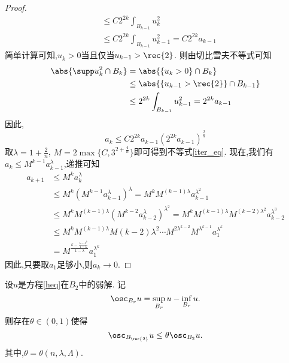 \begin{proof}
\begin{equation}
\begin{split}
            &\le C2^{2k}\int_{B_{k-1}}u_k^2 \\
            &\le C2^{2k}\int_{B_{k-1}}u_{k-1}^2=C2^{2k}a_{k-1}
        \end{split}
    \end{equation}
    简单计算可知,$u_k>0$当且仅当$u_{k-1}> \rec{2}$. 则由切比雪夫不等式可知
    \begin{equation}
        \begin{split}
            \abs{\supp u^2_k \cap B_k}&=\abs{\{u_k>0\}\cap B_k} \\
            &\le \abs{\{u_{k-1}> \rec{2}\} \cap B_{k-1}} \\
            &\le 2^{2k}\int_{B_{k-1}}u^2_{k-1} =2^{2k}a_{k-1}
        \end{split}
    \end{equation}
    因此,
    \begin{equation}
        a_k \le C2^{2k}a_{k-1}(2^{2k}a_{k-1})^\frac{2}{n} 
    \end{equation}
    取$\lambda=1+\frac{2}{n}$, $M=2\max\{C,3^{2+\frac{4}{n}}\}$即可得到不等式\eqref{iter_eq}.  现在,我们有$a_k \le M^{k-1}a_{k-1}^\lambda$,递推可知
    \begin{equation}
        \begin{split}
            a_{k+1} &\le M^ka_k^\lambda\\
            &\le M^k(M^{k-1}a_{k-1}^\lambda)^\lambda =M^kM^{(k-1)\lambda}a_{k-1}^{\lambda^2}\\
            &\le M^k M^{(k-1)\lambda}({{M^{k-2} a_{k-2}^\lambda}})^{\lambda^2}=M^kM^{(k-1)\lambda}M^{(k-2)\lambda^2}a^{\lambda^3}_{k-2}\\
            &\le M^kM^{(k-1)\lambda}M{(k-2)\lambda^2}\cdots M^{2\lambda^{k-2}}M^{\lambda^{k-1}}a_1^{\lambda^k}\\
            &=M^{\frac{k-\frac{\lambda-\lambda^k}{1-\lambda}}{1-\lambda}}a_1^{\lambda^k}
        \end{split}
    \end{equation}
    因此,只要取$a_1$足够小,则$a_k \to 0$.
\end{proof}
\begin{lemma}[振荡衰减]
    设$u$是方程\eqref{heq}在$B_2$中的弱解. 记
    \begin{equation}
        \osc_{B_r} u=\sup_{B_r} u - \inf_{B_r} u. 
    \end{equation}
    则存在$\theta \in (0,1)$使得 
    \begin{equation}
        \osc_{B_\rec{2}} u \le \theta \osc_{B_2}u. 
    \end{equation}
    其中,$\theta=\theta(n,\lambda,\Lambda)$.
\end{lemma}
